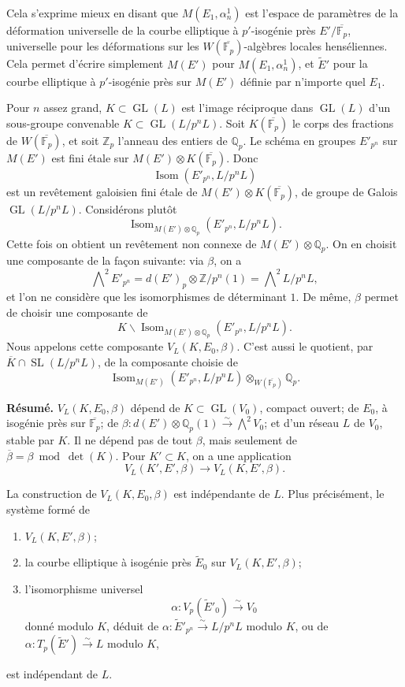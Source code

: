 \documentclass[11pt]{article}
\newcommand{\Z}{\mathbb{Z}}
\newcommand{\Fp}{\mathbb{F}_{p}}
\newcommand{\Qp}{\mathbb{Q}_{p}}
\newcommand{\Zp}{\mathbb{Z}_{p}}
\newcommand{\Isom}{\operatorname{Isom}}
\newcommand{\GL}{\operatorname{GL}}
\newcommand{\SL}{\operatorname{SL}}
\newcommand{\wt}{\widetilde}
\begin{document}
Cela s'exprime mieux en disant que \(M(E_1,\alpha_n^1)\) est l'espace de paramètres de la déformation universelle de la courbe elliptique à \(p'\)-isogénie près \(E'/\overline{\Fp}\), universelle pour les déformations sur les \(W(\overline{\Fp})\)-algèbres locales henséliennes. Cela permet d'écrire simplement \(M(E')\) pour \(M(E_1,\alpha_n^1)\), et \(\wt E'\) pour la courbe elliptique à \(p'\)-isogénie près sur \(M(E')\) définie par n'importe quel \(E_1\).

Pour \(n\) assez grand, \(K\subset\GL(L)\) est l'image réciproque dans \(\GL(L)\) d'un sous-groupe convenable \(K\subset\GL(L/p^nL)\). Soit \(K(\overline{\Fp})\) le corps des fractions de \(W(\overline{\Fp})\), et soit \(\Zp\) l'anneau des entiers de \(\Qp\). Le schéma en groupes \(E'_{p^n}\) sur \(M(E')\) est fini étale sur \(M(E')\otimes K(\overline{\Fp})\). Donc
\[
\Isom(E'_{p^n},L/p^nL)
\]
est un revêtement galoisien fini étale de \(M(E')\otimes K(\overline{\Fp})\), de groupe de Galois \(\GL(L/p^nL)\). Considérons plutôt
\[
\Isom_{M(E')\otimes\Qp}(E'_{p^n},L/p^nL).
\]
Cette fois on obtient un revêtement non connexe de \(M(E')\otimes\Qp\). On en choisit une composante de la façon suivante: via \(\beta\), on a
\[
\bigwedge\nolimits^2E'_{p^n}=d(E')_p\otimes\Z/p^n(1)=\bigwedge\nolimits^2L/p^nL,
\]
et l'on ne considère que les isomorphismes de déterminant \(1\). De même, \(\beta\) permet de choisir une composante de
\[
K\backslash\Isom_{M(E')\otimes\Qp}(E'_{p^n},L/p^nL).
\]
Nous appelons cette composante \(V_L(K,E_0,\beta)\). C'est aussi le quotient, par \(\overline K\cap\SL(L/p^nL)\), de la composante choisie de
\[
\Isom_{M(E')}(E'_{p^n},L/p^nL)\otimes_{W(\overline{\Fp})}\Qp .
\]

\textbf{Résumé.} \(V_L(K,E_0,\beta)\) dépend de \(K\subset\GL(V_0)\), compact ouvert; de \(E_0\), à isogénie près sur \(\overline{\Fp}\); de \(\beta:d(E')\otimes\Qp(1)\xrightarrow{\sim}\bigwedge^2V_0\); et d'un réseau \(L\) de \(V_0\), stable par \(K\). Il ne dépend pas de tout \(\beta\), mais seulement de \(\overline{\beta}=\beta\bmod\det(K)\). Pour \(K'\subset K\), on a une application
\[
V_L(K',E',\beta)\longrightarrow V_L(K,E',\beta).
\]

La construction de \(V_L(K,E_0,\beta)\) est indépendante de \(L\). Plus précisément, le système formé de
\begin{enumerate}[label=(\alph*)]
\item \(V_L(K,E',\beta)\);
\item la courbe elliptique à isogénie près \(\wt E_0\) sur \(V_L(K,E',\beta)\);
\item l'isomorphisme universel
\[
\alpha:V_p(\wt E'_0)\xrightarrow{\sim}V_0
\]
donné modulo \(K\), déduit de \(\alpha:\wt E'_{p^n}\xrightarrow{\sim}L/p^nL\) modulo \(K\), ou de \(\alpha:T_p(\wt E')\xrightarrow{\sim}L\) modulo \(K\),
\end{enumerate}
est indépendant de \(L\).
\end{document}

